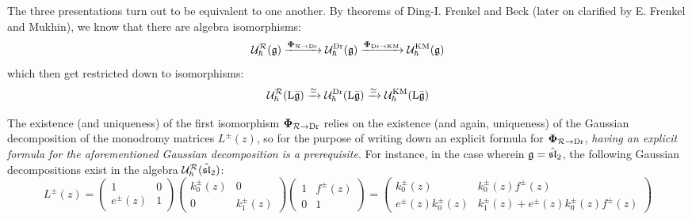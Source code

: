         The three presentations turn out to be equivalent to one another. By theorems of Ding-I. Frenkel and Beck (later on clarified by E. Frenkel and Mukhin), we know that there are algebra isomorphisms:
            $$\mathcal{U}_{\hbar}^{\mathcal{R}}(\mathfrak{g}) \xrightarrow[]{\boldsymbol{\Phi}_{\mathcal{R} \to \mathrm{Dr}}} \mathcal{U}_{\hbar}^{\mathrm{Dr}}(\mathfrak{g}) \xrightarrow[]{\boldsymbol{\Phi}_{\mathrm{Dr} \to \mathrm{KM}}} \mathcal{U}_{\hbar}^{\mathrm{KM}}(\mathfrak{g})$$
        which then get restricted down to isomorphisms:
            $$\mathcal{U}_{\hbar}^{\mathcal{R}}(\mathrm{L} \bar{\mathfrak{g}}) \xrightarrow[]{\simeq} \mathcal{U}_{\hbar}^{\mathrm{Dr}}(\mathrm{L} \bar{\mathfrak{g}}) \xrightarrow[]{\simeq} \mathcal{U}_{\hbar}^{\mathrm{KM}}(\mathrm{L} \bar{\mathfrak{g}})$$
        \begin{remark} \label{remark: gaussian_decompositions_of_monodromy_matrices}
            The existence (and uniqueness) of the first isomorphism $\boldsymbol{\Phi}_{\mathcal{R} \to \mathrm{Dr}}$ relies on the existence (and again, uniqueness) of the Gaussian decomposition of the monodromy matrices $L^{\pm}(z)$, so for the purpose of writing down an explicit formula for $\boldsymbol{\Phi}_{\mathcal{R} \to \mathrm{Dr}}$, \textit{having an explicit formula for the aforementioned Gaussian decomposition is a prerequisite}. For instance, in the case wherein $\mathfrak{g} = \hat{\mathfrak{sl}}_2$, the following Gaussian decompositions exist in the algebra $\mathcal{U}_{\hbar}^{\mathcal{R}}(\hat{\mathfrak{sl}}_2)$:
                \begin{equation} \label{equation: quantum_affine_sl_2_monodromy_matrices_gaussian_decompositions}
                    L^{\pm}(z)
                    =
                    \begin{pmatrix}
                        1 & 0
                        \\
                        e^{\pm}(z) & 1
                    \end{pmatrix}
                    \begin{pmatrix}
                        k_0^{\pm}(z) & 0
                        \\
                        0 & k_1^{\pm}(z)
                    \end{pmatrix}
                    \begin{pmatrix}
                        1 & f^{\pm}(z)
                        \\
                        0 & 1
                    \end{pmatrix}
                    =
                    \begin{pmatrix}
                        k_0^{\pm}(z) & k_0^{\pm}(z) f^{\pm}(z)
                        \\
                        e^{\pm}(z) k_0^{\pm}(z) & k_1^{\pm}(z) + e^{\pm}(z) k_0^{\pm}(z) f^{\pm}(z)

\end{pmatrix}
\end{equation}
\end{remark}
